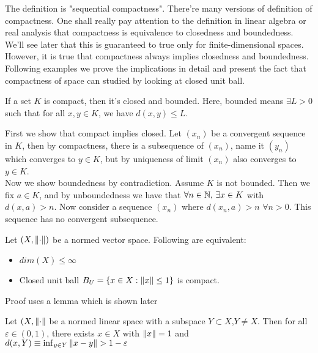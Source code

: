 \begin{remark}\rm\nextline
	The definition is "sequential compactness". There're many versions of definition of compactness. One shall really pay attention to the definition in linear algebra or real analysis that compactness is equivalence to closedness and boundedness. We'll see later that this is guaranteed to true only for finite-dimensional spaces. However, it is true that compactness always implies closedness and boundedness. Following examples we prove the implications in detail and present the fact that compactness of space can studied by looking at closed unit ball.
\end{remark}


\begin{proposition}\rm\nextline
	If a set $K$ is compact, then it's closed and bounded. Here, bounded means $\exists L>0$ such that for all $x,y\in K$, we have $d(x,y)\leq L$.\\
	\begin{pf}{}{}
		First we show that compact implies closed. Let $(x_n)$ be a convergent sequence in $K$, then by compactness, there is a subsequence of $(x_n)$, name it $(y_n)$ which converges to $y\in K$, but by uniqueness of limit $(x_n)$ also converges to $y\in K$.\\
		Now we show boundedness by contradiction. Assume $K$ is not bounded. Then we fix $a\in K$, and by unboundedness we have that $\forall n\in \mathbb{N},\,\exists x\in K$ with $d(x,a)>n$. Now consider a sequence $(x_n)$ where  $d(x_n,a)>n$ $\forall n>0$. This sequence has no convergent subsequence.
	\end{pf}
\end{proposition}


\begin{theorem}[F.Riesz]\label{compact unit balls}\rm\nextline
	Let $(X,\left\|{\cdot}\right\|)$ be a normed vector space. Following are equivalent:
	\begin{itemize}
		\item $dim(X)\leq\infty$
		\item Closed unit ball $B_U=\{x\in X:\left\|{x}\right\|\leq 1\}$ is compact.
	\end{itemize}
	\prf Proof uses a lemma which is shown later\placeholder
\end{theorem}

\begin{lemma}[F.Riesz]\rm\nextline
	Let $(X,\left\|{\cdot}\right\|$ be a normed linear space with a subspace $Y\subset X$,$Y\neq X$.
	Then for all $\varepsilon\in(0,1)$, there exists $x\in X$ with $\left\|{x}\right\|=1$ and $d(x,Y)\equiv\inf_{y\in Y} \norm{x-y}>1-\varepsilon$
	\prf \placeholder
\end{lemma}


